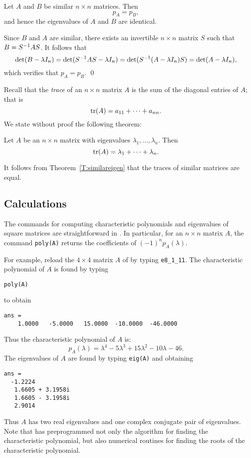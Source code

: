 \begin{thm}  \label{T:similareigen}
Let $A$ and $B$ be similar $n\times n$ matrices.  Then
\[
p_A = p_B,
\]
and hence the eigenvalues of $A$ and $B$ are identical.
\end{thm}  

\proof  Since $B$ and $A$ are similar, there exists an 
invertible $n\times n$ matrix $S$ such that $B=S^{-1} AS$.  It 
follows that 
\[
\det(B-\lambda I_n) = \det(S^{-1} AS-\lambda I_n)
= \det(S^{-1}(A-\lambda I_n)S) = \det(A-\lambda I_n),
\]
which verifies that $p_A=p_B$.  \qed

Recall that the {\em trace\/} of an 
$n\times n$ matrix $A$ is
the sum of the diagonal entries of $A$; that is
\[
{\rm tr}(A) = a_{11} +\cdots+ a_{nn}.
\]
We state without proof the following theorem:
\begin{thm} \label{T:tracen}
Let $A$ be an $n\times n$ matrix with eigenvalues
$\lambda_1,\ldots,\lambda_n$.  Then
\[
{\rm tr}(A) = \lambda_1 + \cdots + \lambda_n.
\]
\end{thm}

It follows from Theorem~\ref{T:similareigen} that the traces of
similar matrices are equal.


\subsection*{\Matlab Calculations}

The commands for computing characteristic polynomials and
eigenvalues of square matrices are straightforward in \Matlab.
In particular, for an $n\times n$ matrix $A$, the \Matlab command
 {\tt poly(A)} returns the coefficients of $(-1)^np_A(\lambda)$.

For example, reload the $4\times 4$ matrix $A$ of 
by typing {\tt e8\_1\_11}.  The characteristic polynomial of $A$ is
found by typing
\begin{verbatim}
poly(A)
\end{verbatim} 
to obtain
\begin{verbatim}
ans =
    1.0000   -5.0000   15.0000  -10.0000  -46.0000
\end{verbatim} 
Thus the characteristic polynomial of $A$ is:
\[
p_A(\lambda) = \lambda^4 -5\lambda^3+15\lambda^2-10\lambda-46.
\]
The eigenvalues of $A$ are found by typing {\tt eig(A)} and
obtaining
\begin{verbatim}
ans =
  -1.2224          
   1.6605 + 3.1958i
   1.6605 - 3.1958i
   2.9014 
\end{verbatim}
Thus $A$ has two real eigenvalues and one complex conjugate pair
of eigenvalues.  Note that \Matlab has preprogrammed not only
the algorithm for finding the characteristic polynomial, but
also numerical routines for finding the roots of the
characteristic polynomial.

